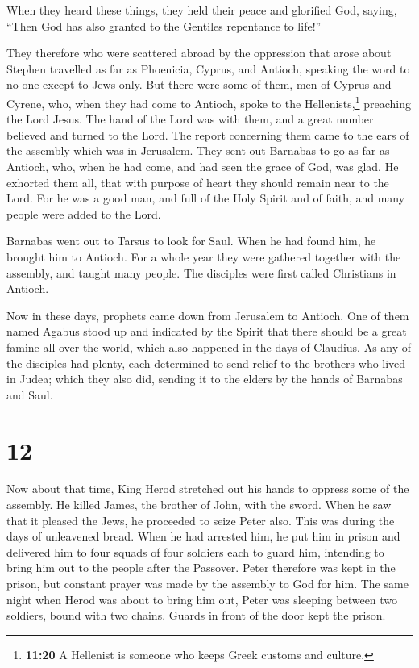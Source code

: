  When they heard these things, they held their peace and
glorified God, saying, ``Then God has also granted to the Gentiles
repentance to life!''

 They therefore who were scattered abroad by the
oppression that arose about Stephen travelled as far as Phoenicia,
Cyprus, and Antioch, speaking the word to no one except to Jews only.
 But there were some of them, men of Cyprus and Cyrene,
who, when they had come to Antioch, spoke to the Hellenists,\footnote{\textbf{11:20}
  A Hellenist is someone who keeps Greek customs and culture.} preaching
the Lord Jesus.  The hand of the Lord was with them, and
a great number believed and turned to the Lord.  The
report concerning them came to the ears of the assembly which was in
Jerusalem. They sent out Barnabas to go as far as Antioch,
 who, when he had come, and had seen the grace of God,
was glad. He exhorted them all, that with purpose of heart they should
remain near to the Lord.  For he was a good man, and full
of the Holy Spirit and of faith, and many people were added to the Lord.

 Barnabas went out to Tarsus to look for Saul.
 When he had found him, he brought him to Antioch. For a
whole year they were gathered together with the assembly, and taught
many people. The disciples were first called Christians in Antioch.

 Now in these days, prophets came down from Jerusalem to
Antioch.  One of them named Agabus stood up and indicated
by the Spirit that there should be a great famine all over the world,
which also happened in the days of Claudius.  As any of
the disciples had plenty, each determined to send relief to the brothers
who lived in Judea;  which they also did, sending it to
the elders by the hands of Barnabas and Saul.

\hypertarget{section-11}{%
\section{12}\label{section-11}}

 Now about that time, King Herod stretched out his hands
to oppress some of the assembly.  He killed James, the
brother of John, with the sword.  When he saw that it
pleased the Jews, he proceeded to seize Peter also. This was during the
days of unleavened bread.  When he had arrested him, he
put him in prison and delivered him to four squads of four soldiers each
to guard him, intending to bring him out to the people after the
Passover.  Peter therefore was kept in the prison, but
constant prayer was made by the assembly to God for him. 
The same night when Herod was about to bring him out, Peter was sleeping
between two soldiers, bound with two chains. Guards in front of the door
kept the prison.


